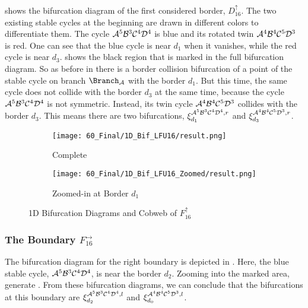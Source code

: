 shows the bifurcation diagram of the first considered border, $D_{16}^\uparrow$.
The two existing stable cycles at the beginning are drawn in different colors to differentiate them.
The cycle $\mathcal{A}^5\mathcal{B}^3\mathcal{C}^4\mathcal{D}^4$ is blue and its rotated twin $\mathcal{A}^4\mathcal{B}^4\mathcal{C}^5\mathcal{D}^3$ is red.
One can see that the blue cycle is near $d_1$ when it vanishes, while the red cycle is near $d_3$.
 shows the black region that is marked in the full bifurcation diagram.
So as before in  there is a border collision bifurcation of a point of the stable cycle on branch $\Branch_\A$ with the border $d_1$.
But this time, the same cycle does not collide with the border $d_3$ at the same time, because the cycle $\mathcal{A}^5\mathcal{B}^3\mathcal{C}^4\mathcal{D}^4$ is not symmetric.
Instead, its twin cycle $\mathcal{A}^4\mathcal{B}^4\mathcal{C}^5\mathcal{D}^3$ collides with the border $d_3$.
This means there are two bifurcations, $\xi_{d_1}^{\mathcal{A}^5\mathcal{B}^3\mathcal{C}^4\mathcal{D}^4, r}$ and $\xi_{d_3}^{\mathcal{A}^4\mathcal{B}^4\mathcal{C}^5\mathcal{D}^3, r}$.

\begin{figure}
    \centering
    \begin{subfigure}{0.4\textwidth}
        \centering
        \texttt{[image: 60\_Final/1D\_Bif\_LFU16/result.png]}
        \caption{Complete}
        \label{fig:final.bifurcation.F.up}
    \end{subfigure}
    \begin{subfigure}{0.4\textwidth}
        \centering
        \texttt{[image: 60\_Final/1D\_Bif\_LFU16\_Zoomed/result.png]}
        \caption{Zoomed-in at Border $d_1$}
        \label{fig:final.bifurcation.F.up.zoomed}
    \end{subfigure}
    \caption{1D Bifurcation Diagrams and Cobweb of $F_{16}^\uparrow$}
\end{figure}

\subsubsection{The Boundary $F_{16}^\rightarrow$}

The bifurcation diagram for the right boundary is depicted in .
Here, the blue stable cycle, $\mathcal{A}^5\mathcal{B}^3\mathcal{C}^4\mathcal{D}^4$, is near the border $d_2$.
Zooming into the marked area, generate .
From these bifurcation diagrams, we can conclude that the bifurcations at this boundary are $\xi_{d_2}^{\mathcal{A}^5\mathcal{B}^3\mathcal{C}^4\mathcal{D}^4, l}$ and $\xi_{d_0}^{\mathcal{A}^4\mathcal{B}^4\mathcal{C}^5\mathcal{D}^3, l}$.


